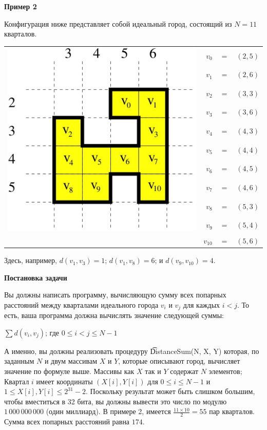 \bf{Пример 2}

Конфигурация ниже представляет собой идеальный город, состоящий из $N = 11$ кварталов.

\begin{tabular}{crcl}
\multirow{10}{*}{\includegraphics[height = 27ex]{2012-4-02.jpg}}& 
$v_0$ &$=$& $(2,5)$\\
&$v_1$ &$=$& $(2,6)$\\
&$v_2$ &$=$& $(3,3)$\\
&$v_3$ &$=$& $(3,6)$\\
&$v_4$ &$=$& $(4,3)$\\
&$v_5$ &$=$& $(4,4)$\\
&$v_6$ &$=$& $(4,5)$\\
&$v_7$ &$=$& $(4,6)$\\
&$v_8$ &$=$& $(5,3)$\\
&$v_9$ &$=$& $(5,4)$\\
&$v_{10}$ &$=$& $(5,6)$\\
\end{tabular}

Здесь, например, $d(v_1, v_3) = 1$; $d(v_1, v_8) = 6$; и $d(v_9, v_{10}) = 4$.

\bf{Постановка задачи}

Вы должны написать программу, вычисляющую сумму всех попарных расстояний между кварталами идеального города $v_i$ и $v_j$ для каждых $i < j$. То есть, ваша программа должна вычислять значение следующей суммы: 

\begin{center}
$\sum d(v_i, v_j)$; где $0 \le i < j \le N-1$
\end{center}

А именно, вы должны реализовать процедуру \t{DistanceSum(N, X, Y)} которая, по заданным $N$ и двум массивам $X$ и $Y$, которые описывают город, вычисляет значение по формуле выше. Массивы как $X$ так и $Y$ содержат $N$ элементов; Квартал $i$ имеет координаты $(X[i], Y[i])$ для $0 \le i \le N - 1$ и $1 \le X[i], Y[i] \le 2^{31} - 2$. Поскольку результат может быть слишком большим, чтобы вместиться в 32 бита, вы должны вывести это число по модулю $1\,000\,000\,000$ (один миллиард). В примере 2, имеется $\frac{11 × 10}{2} = 55$ пар кварталов. Сумма всех попарных расстояний равна $174$.

